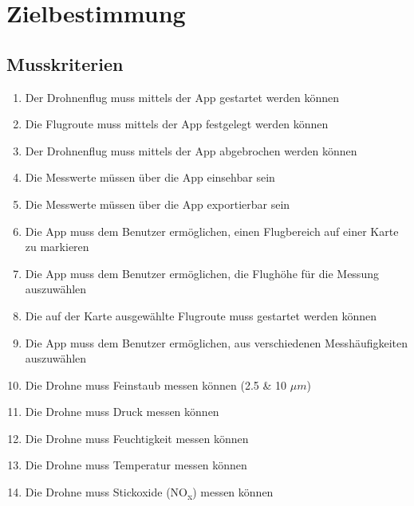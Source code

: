 


\chapter{Zielbestimmung}\label{cha:Zielbestimmung}
 





\section{Musskriterien}\label{sec:Musskriterien}
\begin{enumerate}[label=\roman*.]
	\item Der Drohnenflug muss mittels der App gestartet werden können
	\item Die Flugroute muss mittels der App festgelegt werden können
	\item Der Drohnenflug muss mittels der App abgebrochen werden können
	\item Die Messwerte müssen über die App einsehbar sein
	\item Die Messwerte müssen über die App exportierbar sein
	\item Die App muss dem Benutzer ermöglichen, einen Flugbereich auf einer Karte zu markieren
	\item Die App muss dem Benutzer ermöglichen, die Flughöhe für die Messung auszuwählen
	\item Die auf der Karte ausgewählte Flugroute muss gestartet werden können
	\item Die App muss dem Benutzer ermöglichen, aus verschiedenen Messhäufigkeiten auszuwählen
	\item Die Drohne muss Feinstaub messen können (2.5 \& 10 $\mu m$)
	\item Die Drohne muss Druck messen können
	\item Die Drohne muss Feuchtigkeit messen können
	\item Die Drohne muss Temperatur messen können
	\item Die Drohne muss Stickoxide (NO\textsubscript{x}) messen können	
\end{enumerate}
	

